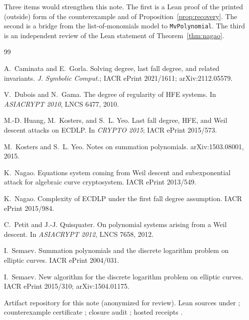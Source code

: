 \documentclass[11pt,a4paper]{article}
\theoremstyle{plain}
\theoremstyle{definition}
\theoremstyle{remark}
\begin{document}
Three items would strengthen this note. The first is a Lean proof of the
printed (outside) form of the counterexample and of
Proposition~\ref{prop:recovery}. The second is a bridge from the
list-of-monomials model to \texttt{MvPolynomial}. The third is an independent
review of the Lean statement of Theorem~\ref{thm:nagao}.

\begin{thebibliography}{99}

A.~Caminata and E.~Gorla.
\newblock Solving degree, last fall degree, and related invariants.
\newblock \emph{J. Symbolic Comput.}; IACR ePrint 2021/1611; arXiv:2112.05579.

V.~Dubois and N.~Gama.
\newblock The degree of regularity of {HFE} systems.
\newblock In \emph{ASIACRYPT 2010}, LNCS 6477, 2010.

M.-D. Huang, M.~Kosters, and S.~L. Yeo.
\newblock Last fall degree, {HFE}, and {W}eil descent attacks on {ECDLP}.
\newblock In \emph{CRYPTO 2015}; IACR ePrint 2015/573.

M.~Kosters and S.~L. Yeo.
\newblock Notes on summation polynomials.
\newblock arXiv:1503.08001, 2015.

K.~Nagao.
\newblock Equations system coming from {W}eil descent and subexponential
  attack for algebraic curve cryptosystem.
\newblock IACR ePrint 2013/549.

K.~Nagao.
\newblock Complexity of {ECDLP} under the first fall degree assumption.
\newblock IACR ePrint 2015/984.

C.~Petit and J.-J. Quisquater.
\newblock On polynomial systems arising from a {W}eil descent.
\newblock In \emph{ASIACRYPT 2012}, LNCS 7658, 2012.

I.~Semaev.
\newblock Summation polynomials and the discrete logarithm problem on
  elliptic curves.
\newblock IACR ePrint 2004/031.

I.~Semaev.
\newblock New algorithm for the discrete logarithm problem on elliptic
  curves.
\newblock IACR ePrint 2015/310; arXiv:1504.01175.

Artifact repository for this note (anonymized for review). Lean sources
under ; counterexample certificate
; closure audit
; hosted receipts
.

\end{thebibliography}
\end{document}
